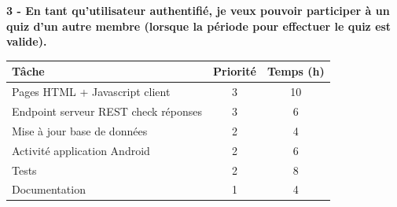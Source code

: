 \documentclass[a4paper, 12pt]{article}
\newenvironment{code}{\captionsetup{type=listing}}{}
\begin{document}
\bigbreak
\bigbreak
\textbf{3 - En tant qu'utilisateur authentifié, je veux pouvoir participer à un quiz d'un autre membre (lorsque la période pour effectuer le quiz est valide).}
\bigbreak
\begin{tabular}{|p{.6\linewidth}|c|c|} \hline
	\textbf{Tâche} & \textbf{Priorité} & \textbf{Temps (h)} \\ \hline
	Pages HTML + Javascript client & 3 & 10 \\ \hline
	Endpoint serveur REST check réponses & 3 & 6 \\ \hline
	Mise à jour base de données & 2 & 4 \\ \hline
	Activité application Android & 2 & 6 \\ \hline
    Tests & 2 & 8 \\ \hline
    Documentation & 1 & 4 \\ \hline
\end{tabular}



\end{document}
